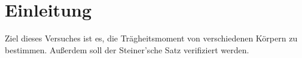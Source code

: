 \section{Einleitung}
\label{sec:Einleitung}
Ziel dieses Versuches ist es, die Trägheitsmoment von verschiedenen Körpern zu bestimmen. Außerdem soll der Steiner'sche Satz verifiziert werden.
\\
\\
\\
